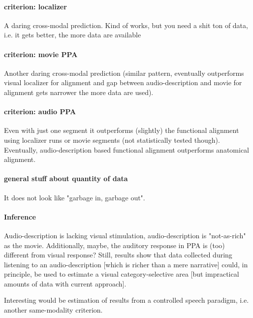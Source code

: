 

\paragraph{criterion: localizer}
%
A daring cross-modal prediction.
%
Kind of works, but you need a shit ton of data, i.e. it gets better, the more
data are available


\paragraph{criterion: movie PPA}
%
Another daring cross-modal prediction (similar pattern, eventually outperforms
visual localizer for alignment and gap between audio-description and movie for
alignment gets narrower the more data are used).

\paragraph{criterion: audio PPA}
%
Even with just one segment it outperforms (slightly) the functional alignment
using localizer runs or movie segments (not statistically tested though).
%
Eventually, audio-description based functional alignment outperforms anatomical
alignment.


\paragraph{general stuff about quantity of data}
%
It does not look like "garbage in, garbage out".

\paragraph{Inference}


%
Audio-description is lacking visual stimulation, audio-description is
"not-as-rich" as the movie.
%
Additionally, maybe, the auditory response in PPA is (too) different from visual
response?
%
Still, results show that data collected during listening to an audio-description
[which is richer than a mere narrative] could, in principle, be used to estimate
a visual category-selective area [but impractical amounts of data with current
approach].

%
Interesting would be estimation of results from a controlled speech
paradigm, i.e. another same-modality criterion.


